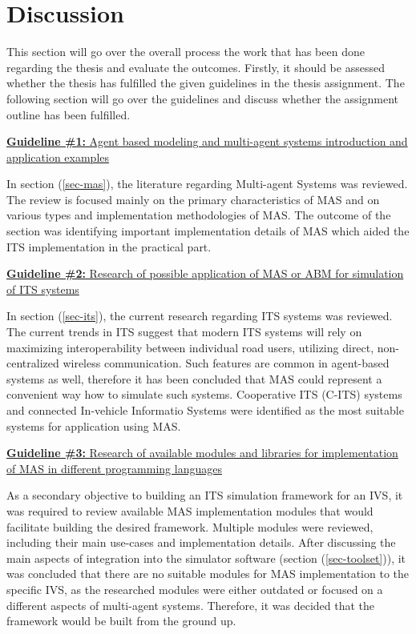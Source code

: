 \documentclass[main.tex]{subfiles}
\begin{document}
\section{Discussion}

This section will go over the overall process the work that has been done regarding the thesis and evaluate the outcomes.
Firstly, it should be assessed whether the thesis has fulfilled the given guidelines in the thesis assignment. The following 
section will go over the guidelines and discuss whether the assignment outline has been fulfilled. 

\ul{\textbf{Guideline \#1:} Agent based modeling and multi-agent systems introduction and application examples}

In section (\ref{sec-mas}), the literature regarding Multi-agent Systems was reviewed. The review is focused mainly on the 
primary characteristics of MAS and on various types and implementation methodologies of MAS. The outcome of the section 
was identifying important implementation details of MAS which aided the ITS implementation in the practical part. 

\ul{\textbf{Guideline \#2:} Research of possible application of MAS or ABM for simulation of ITS systems}

In section (\ref{sec-its}), the current research regarding ITS systems was reviewed. The current trends in ITS suggest that 
modern ITS systems will rely on maximizing interoperability between individual road users, utilizing direct, non-centralized wireless 
communication. Such features are common in agent-based systems as well, therefore it has been concluded that MAS could represent 
a convenient way how to simulate such systems. Cooperative ITS (C-ITS) systems and connected In-vehicle Informatio Systems were 
identified as the most suitable systems for application using MAS.

\ul{\textbf{Guideline \#3:} Research of available modules and libraries for implementation of MAS in different programming
languages}

As a secondary objective to building an ITS simulation framework for an IVS, it was required to review available MAS implementation 
modules that would facilitate building the desired framework. Multiple modules were reviewed, including their main use-cases 
and implementation details. After discussing the main aspects of integration into the simulator
software (section (\ref{sec-toolset})), it was concluded that there are no suitable modules for MAS implementation to the
specific IVS, as the researched modules were either outdated or focused on a different aspects
of multi-agent systems. Therefore, it was decided that the framework would be built from the
ground up.
\end{document}
